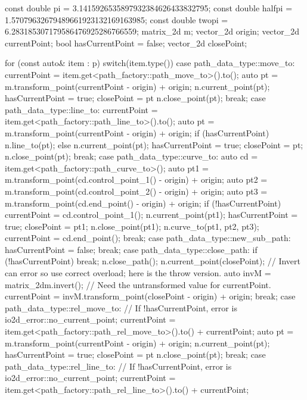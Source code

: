 \begin{codeblock}
const double pi =     3.1415926535897932384626433832795;
const double halfpi = 1.57079632679489661923132169163985;
const double twopi =  6.283185307179586476925286766559;
matrix_2d m;
vector_2d origin;
vector_2d currentPoint;
bool hasCurrentPoint = false;
vector_2d closePoint;

for (const auto& item : p) {
  switch(item.type()) {
  case path_data_type::move_to:
  {
    currentPoint = item.get<path_factory::path_move_to>().to();
    auto pt = m.transform_point(currentPoint - origin) + origin;
    n.current_point(pt);
    hasCurrentPoint = true;
    closePoint = pt
    n.close_point(pt);
  } break;
  case path_data_type::line_to:
  {
    currentPoint = item.get<path_factory::path_line_to>().to();
    auto pt = m.transform_point(currentPoint - origin) + origin;
    if (hasCurrentPoint) {
      n.line_to(pt);
    }
    else {
      n.current_point(pt);
      hasCurrentPoint = true;
      closePoint = pt;
      n.close_point(pt);
    }
  } break;
  case path_data_type::curve_to:
  {
    auto cd = item.get<path_factory::path_curve_to>();
    auto pt1 = m.transform_point(cd.control_point_1() - origin) + origin;
    auto pt2 = m.transform_point(cd.control_point_2() - origin) + origin;
    auto pt3 = m.transform_point(cd.end_point() - origin) + origin;
    if (!hasCurrentPoint) {
      currentPoint = cd.control_point_1();
      n.current_point(pt1);
      hasCurrentPoint = true;
      closePoint = pt1;
      n.close_point(pt1);
    }
    n.curve_to(pt1, pt2, pt3);
    currentPoint = cd.end_point();
  } break;
  case path_data_type::new_sub_path:
  {
    hasCurrentPoint = false;
  } break;
  case path_data_type::close_path:
  {
    if (!hasCurrentPoint) {
      break;
    }
    n.close_path();
    n.current_point(closePoint);
    // Invert can error so use correct overload; here is the throw version.
    auto invM = matrix_2d{m}.invert();
    // Need the untransformed value for currentPoint.
    currentPoint = invM.transform_point(closePoint - origin) + origin;
  } break;
  case path_data_type::rel_move_to:
  {
    // If !hasCurrentPoint, error is io2d_error::no_current_point;
    currentPoint = item.get<path_factory::path_rel_move_to>().to() + currentPoint;
    auto pt = m.transform_point(currentPoint - origin) + origin;
    n.current_point(pt);
    hasCurrentPoint = true;
    closePoint = pt    
    n.close_point(pt);
  } break;
  case path_data_type::rel_line_to:
  {
    // If !hasCurrentPoint, error is io2d_error::no_current_point;
    currentPoint = item.get<path_factory::path_rel_line_to>().to() + currentPoint;
}}}
\end{codeblock}
